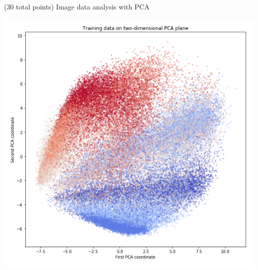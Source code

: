 \documentclass[12pt]{article}
\begin{document}
\begin{question}{(30 total points) Image data analysis with PCA}
\begin{subquestion}
   

      \begin{answerbox}{40em}
         \begin{center}
	\includegraphics[width=\textwidth]{imgs/1_8.png}
	\end{center}
      \end{answerbox}
  


   \end{subquestion}
   

\end{question}
\clearpage
%
%
\end{document}
